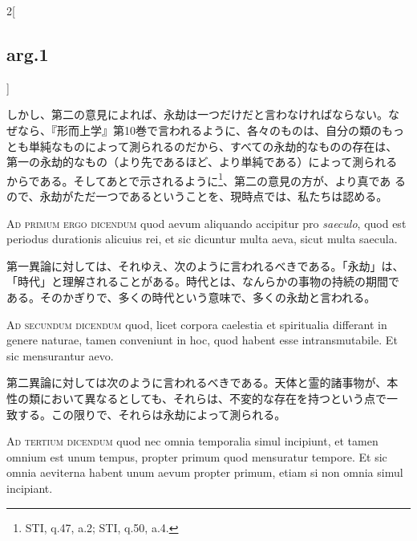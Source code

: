 \documentclass[paper=a4paper,fontsize=10pt,jafontsize=9pt,titlepage]{jlreq}
\begin{document}
\begin{paracol}{2}[\subsection{arg.1}]
\switchcolumn

しかし、第二の意見によれば、永劫は一つだけだと言わなければならない。な
ぜなら、『形而上学』第10巻で言われるように、各々のものは、自分の類のもっ
とも単純なものによって測られるのだから、すべての永劫的なものの存在は、
第一の永劫的なもの（より先であるほど、より単純である）によって測られる
からである。そしてあとで示されるように\footnote{STI, q.47, a.2; STI,
 q.50, a.4.}、第二の意見の方が、より真であ
るので、永劫がただ一つであるということを、現時点では、私たちは認める。

\switchcolumn*[\subsection{ad.1}]

{\scshape Ad primum ergo dicendum} quod aevum aliquando accipitur pro {\itshape saeculo}, quod
est periodus durationis alicuius rei, et sic dicuntur multa aeva, sicut
multa saecula.

\switchcolumn

第一異論に対しては、それゆえ、次のように言われるべきである。「永劫」は、
「時代」と理解されることがある。時代とは、なんらかの事物の持続の期間で
ある。そのかぎりで、多くの時代という意味で、多くの永劫と言われる。

\switchcolumn*[\subsection{ad.2}]

{\scshape Ad secundum dicendum} quod, licet corpora caelestia et spiritualia
differant in genere naturae, tamen conveniunt in hoc, quod habent esse
intransmutabile. Et sic mensurantur aevo.

\switchcolumn

第二異論に対しては次のように言われるべきである。天体と霊的諸事物が、本
性の類において異なるとしても、それらは、不変的な存在を持つという点で一
致する。この限りで、それらは永劫によって測られる。

\switchcolumn*[\subsection{ad.3}]

{\scshape Ad tertium dicendum} quod nec omnia temporalia simul incipiunt, et tamen
omnium est unum tempus, propter primum quod mensuratur tempore. Et sic
omnia aeviterna habent unum aevum propter primum, etiam si non omnia
simul incipiant.


\end{paracol}
\end{document}
